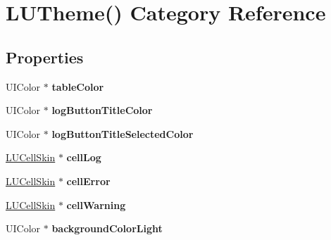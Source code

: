 \hypertarget{category_l_u_theme_07_08}{}\section{L\+U\+Theme() Category Reference}
\label{category_l_u_theme_07_08}
\subsection*{Properties}
\begin{DoxyCompactItemize}
\item 
\mbox{\label{category_l_u_theme_07_08_a647d5c827e565659afccf1fe1525b834}} 
U\+I\+Color $\ast$ {\bfseries table\+Color}
\item 
\mbox{\label{category_l_u_theme_07_08_a1c25a245c5f07b493fc5636b496a8004}} 
U\+I\+Color $\ast$ {\bfseries log\+Button\+Title\+Color}
\item 
\mbox{\label{category_l_u_theme_07_08_aefb6f9644dd63c84816e9d603b9df9c5}} 
U\+I\+Color $\ast$ {\bfseries log\+Button\+Title\+Selected\+Color}
\item 
\mbox{\label{category_l_u_theme_07_08_a0e70254f3489a61eb18d2095ad7a8c74}} 
\mbox{\hyperlink{interface_l_u_cell_skin}{L\+U\+Cell\+Skin}} $\ast$ {\bfseries cell\+Log}
\item 
\mbox{\label{category_l_u_theme_07_08_acb5a81ef9810c2ecffb1a5e640a68261}} 
\mbox{\hyperlink{interface_l_u_cell_skin}{L\+U\+Cell\+Skin}} $\ast$ {\bfseries cell\+Error}
\item 
\mbox{\label{category_l_u_theme_07_08_a59d8a3743eaf995faa8c66e3698cf7dd}} 
\mbox{\hyperlink{interface_l_u_cell_skin}{L\+U\+Cell\+Skin}} $\ast$ {\bfseries cell\+Warning}
\item 
\mbox{\label{category_l_u_theme_07_08_adb3d77684bcff94606e0fea0d80cfb43}} 
U\+I\+Color $\ast$ {\bfseries background\+Color\+Light}
\item 
\mbox{\label{category_l_u_theme_07_08_a2116604f5f16bf44fb78ad19e8856d35}} 

\end{DoxyCompactItemize}
